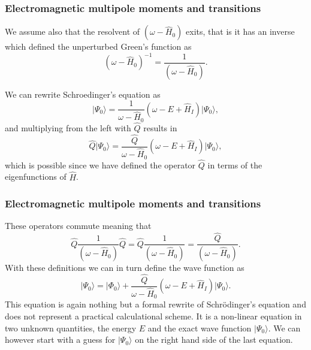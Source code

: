 \documentclass{beamer}
\begin{document}
\begin{frame}
\frametitle{Electromagnetic multipole moments and transitions}

\begin{block}{}
We assume also that the resolvent of $\left(\omega-\hat{H}_0\right)$ exits, that is
it has an inverse which defined the unperturbed Green's function as
\[
\left(\omega-\hat{H}_0\right)^{-1}=\frac{1}{\left(\omega-\hat{H}_0\right)}.
\]

We can rewrite Schroedinger's equation as
\[
\vert \Psi_0\rangle=\frac{1}{\omega-\hat{H}_0}\left(\omega-E+\hat{H}_I\right)\vert \Psi_0\rangle,
\]
and multiplying from the left with $\hat{Q}$ results in
\[
\hat{Q}\vert \Psi_0\rangle=\frac{\hat{Q}}{\omega-\hat{H}_0}\left(\omega-E+\hat{H}_I\right)\vert \Psi_0\rangle,
\]
which is possible since we have defined the operator $\hat{Q}$ in terms of the eigenfunctions of $\hat{H}$.

\end{block}
\end{frame}

\begin{frame}
\frametitle{Electromagnetic multipole moments and transitions}

\begin{block}{}
These operators commute meaning that
\[
\hat{Q}\frac{1}{\left(\omega-\hat{H}_0\right)}\hat{Q}=\hat{Q}\frac{1}{\left(\omega-\hat{H}_0\right)}=\frac{\hat{Q}}{\left(\omega-\hat{H}_0\right)}.
\]
With these definitions we can in turn define the wave function as 
\[
\vert \Psi_0\rangle=\vert \Phi_0\rangle+\frac{\hat{Q}}{\omega-\hat{H}_0}\left(\omega-E+\hat{H}_I\right)\vert \Psi_0\rangle.
\]
This equation is again nothing but a formal rewrite of Schr\"odinger's equation
and does not represent a practical calculational scheme.  
It is a non-linear equation in two unknown quantities, the energy $E$ and the exact
wave function $\vert \Psi_0\rangle$. We can however start with a guess for $\vert \Psi_0\rangle$ on the right hand side of the last equation.
\end{block}
\end{frame}
\end{document}
